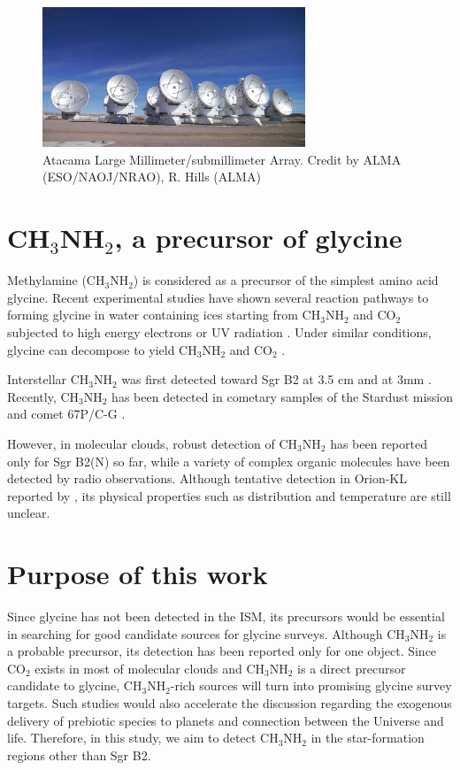 \begin{figure}[H]
  \centering
  \includegraphics[width=0.7\textwidth]{ALMA.eps}
  \caption{Atacama Large Millimeter/submillimeter Array. Credit by ALMA (ESO/NAOJ/NRAO), R. Hills (ALMA)}
\end{figure}

\newpage
\section{CH$_3$NH$_2$, a precursor of glycine}
Methylamine (CH$_3$NH$_2$) is considered as a precursor of the simplest amino acid glycine. 
Recent experimental studies have shown several reaction pathways to forming
glycine in water containing ices starting from CH$_3$NH$_2$ and CO$_2$
subjected to high energy electrons \citep{Holtom+2005} or UV radiation \citep{Bossa+2009, Lee+2009}. Under similar conditions, glycine can decompose to yield CH$_3$NH$_2$ and CO$_2$
\citep{Ehrenfreund+2001}. 

Interstellar CH$_3$NH$_2$ was first detected toward Sgr B2 at 3.5 cm \citep{Fourikis+1974} 
and at 3mm \citep{Kaifu+1974}. Recently, CH$_3$NH$_2$ has been detected 
in cometary samples of the Stardust mission \citep{Glavin+2008} and comet 67P/C-G \citep{Altwegg+2016, Altwegg+2017}.

However, in molecular clouds, 
 robust detection of CH$_3$NH$_2$ has been reported only for Sgr B2(N) \citep{Halfen+2013}  so far, 
while a variety of complex organic molecules have been detected by radio observations.
Although tentative detection in Orion-KL reported by \citet{Pagani+2017}, its physical properties 
such as distribution and temperature are still unclear.

\newpage
\section{Purpose of this work}
Since glycine has not been detected in the ISM, its precursors would be essential in
searching for good candidate sources for glycine surveys. 
Although CH$_3$NH$_2$  is a probable precursor, its detection has been reported only for one object. 
Since CO$_2$ exists in most of molecular clouds and CH$_3$NH$_2$ is a direct precursor
candidate to glycine, CH$_3$NH$_2$-rich sources will turn into promising glycine survey targets. 
Such studies would also accelerate the discussion regarding the exogenous delivery of 
prebiotic species to planets and connection between the Universe and life.
Therefore, in this study, we aim to detect CH$_3$NH$_2$ in the star-formation regions other than Sgr B2.

